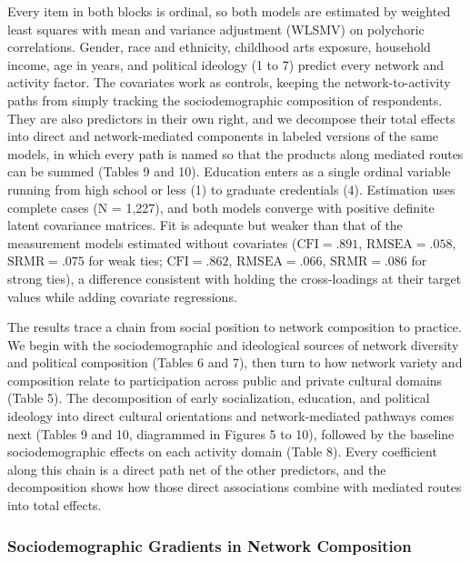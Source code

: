 \documentclass[
  12pt
]{article}
\begin{document}
Every item in both blocks is ordinal, so both models are estimated by weighted least squares with mean and variance adjustment (WLSMV) on polychoric correlations. Gender, race and ethnicity, childhood arts exposure, household income, age in years, and political ideology (1 to 7) predict every network and activity factor. The covariates work as controls, keeping the network-to-activity paths from simply tracking the sociodemographic composition of respondents. They are also predictors in their own right, and we decompose their total effects into direct and network-mediated components in labeled versions of the same models, in which every path is named so that the products along mediated routes can be summed (Tables 9 and 10). Education enters as a single ordinal variable running from high school or less (1) to graduate credentials (4). Estimation uses complete cases (N = 1,227), and both models converge with positive definite latent covariance matrices. Fit is adequate but weaker than that of the measurement models estimated without covariates ($\text{CFI} = .891$, $\text{RMSEA} = .058$, $\text{SRMR} = .075$ for weak ties; $\text{CFI} = .862$, $\text{RMSEA} = .066$, $\text{SRMR} = .086$ for strong ties), a difference consistent with holding the cross-loadings at their target values while adding covariate regressions.

The results trace a chain from social position to network composition to practice. We begin with the sociodemographic and ideological sources of network diversity and political composition (Tables 6 and 7), then turn to how network variety and composition relate to participation across public and private cultural domains (Table 5). The decomposition of early socialization, education, and political ideology into direct cultural orientations and network-mediated pathways comes next (Tables 9 and 10, diagrammed in Figures 5 to 10), followed by the baseline sociodemographic effects on each activity domain (Table 8). Every coefficient along this chain is a direct path net of the other predictors, and the decomposition shows how those direct associations combine with mediated routes into total effects.

\subsubsection{Sociodemographic Gradients in Network Composition}\label{sociodemographic-gradients-in-network-composition}
\end{document}

